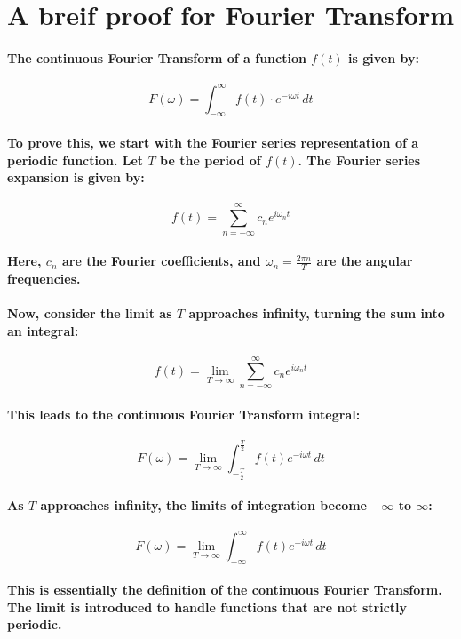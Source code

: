 % 
% 
\appendix
% 
\section{A breif proof for Fourier Transform}\label{sec:Fourier}
% 
\paragraph{The continuous Fourier Transform of a function \( f(t) \) is given by:}
\[ F(\omega) = \int_{-\infty}^{\infty} f(t) \cdot e^{-i \omega t} \,dt \]
\paragraph{To prove this, we start with the Fourier series representation of a periodic function. Let \( T \) be the period of \( f(t) \). The Fourier series expansion is given by:}
% 
\[ f(t) = \sum_{n=-\infty}^{\infty} c_n e^{i \omega_n t} \]
% 
\paragraph{Here, \( c_n \) are the Fourier coefficients, and \( \omega_n = \frac{2\pi n}{T} \) are the angular frequencies.}
% 
\paragraph{Now, consider the limit as \( T \) approaches infinity, turning the sum into an integral:}
% 
\[ f(t) = \lim_{T \to \infty} \sum_{n=-\infty}^{\infty} c_n e^{i \omega_n t} \]
% 
\paragraph{This leads to the continuous Fourier Transform integral:}
% 
\[ F(\omega) = \lim_{T \to \infty} \int_{-\frac{T}{2}}^{\frac{T}{2}} f(t) e^{-i \omega t} \,dt \]
% 
\paragraph{As \( T \) approaches infinity, the limits of integration become \( -\infty \) to \( \infty \):}
% 
\[ F(\omega) = \lim_{T \to \infty} \int_{-\infty}^{\infty} f(t) e^{-i \omega t} \,dt \]
% 
\paragraph{This is essentially the definition of the continuous Fourier Transform. The limit is introduced to handle functions that are not strictly periodic.}
% 
